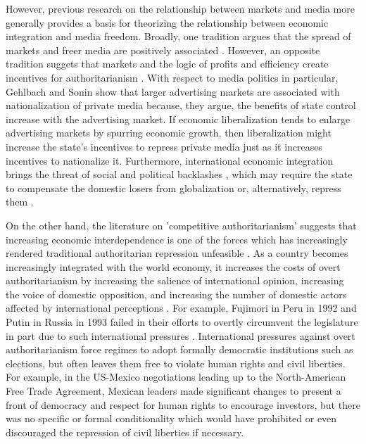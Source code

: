 \documentclass[12pt,a4paper]{article}\usepackage[]{graphicx}\usepackage[]{color}
\begin{document}
However, previous research on the relationship between markets and media more generally provides a basis for theorizing the relationship between economic integration and media freedom. Broadly, one tradition argues that the spread of markets and freer media are positively associated \parencites{Habermas:1991vg}{Islam:2002uc}{Islam:2003tu}. However, an opposite tradition suggets that markets and the logic of profits and efficiency create incentives for authoritarianism \parencite{Huntington:1975vt}. With respect to media politics in particular, Gehlbach and Sonin \parencite*{Gehlbach:2011ky} show that larger advertising markets are associated with nationalization of private media because, they argue, the benefits of state control increase with the advertising market. If economic liberalization tends to enlarge advertising markets by spurring economic growth, then liberalization might increase the state's incentives to repress private media just as it increases incentives to nationalize it. Furthermore, international economic integration brings the threat of social and political backlashes \parencite{Bussmann:2007vx}, which may require the state to compensate the domestic losers from globalization \parencite{Rodrik:1998te} or, alternatively, repress them \parencite{Adsera:2002vt}.

On the other hand, the literature on 'competitive authoritarianism' suggests that increasing economic interdependence is one of the forces which has increasingly rendered traditional authoritarian repression unfeasible \parencite[60, 62]{Levitsky:2002gx}. As a country becomes increasingly integrated with the world economy, it increases the costs of overt authoritarianism by increasing the salience of international opinion, increasing the voice of domestic opposition, and increasing the number of domestic actors affected by international perceptions \parencite{Levitsky:2006ex}. For example, Fujimori in Peru in 1992 and Putin in Russia in 1993 failed in their efforts to overtly circumvent the legislature in part due to such international pressures \parencite[56]{Levitsky:2002gx}. International pressures against overt authoritarianism force regimes to adopt formally democratic institutions such as elections, but often leaves them free to violate human rights and civil liberties. For example, in the US-Mexico negotiations leading up to the North-American Free Trade Agreement, Mexican leaders made significant changes to present a front of democracy and respect for human rights to encourage investors, but there was no specific or formal conditionality which would have prohibited or even discouraged the repression of civil liberties if necessary.
\end{document}

